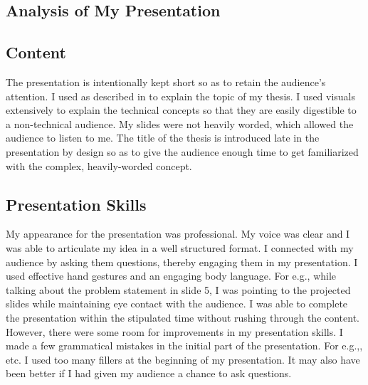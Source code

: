 \documentclass[letterpaper,12pt]{article}
\begin{document}
\begin{singlespacing}
\section*{Analysis of My Presentation}
\subsection*{Content}
The presentation is intentionally kept short so as to retain the audience's attention. I used  as described in \citep{markel_selber_2018} to explain the topic of my thesis. I used visuals extensively to explain the technical concepts so that they are easily digestible to a non-technical audience. My slides were not heavily worded, which allowed the audience to listen to me. The title of the thesis is introduced late in the presentation by design so as to give the audience enough time to get familiarized with the complex, heavily-worded concept.
\subsection*{Presentation Skills}
My appearance for the presentation was professional. My voice was clear and I was able to articulate my idea in a well structured format. I connected with my audience by asking them questions, thereby engaging them in my presentation. I used effective hand gestures and an engaging body language. For e.g., while talking about the problem statement in slide 5, I was pointing to the projected slides while maintaining eye contact with the audience. I was able to complete the presentation within the stipulated time without rushing through the content. \\
However, there were some room for improvements in my presentation skills. I made a few grammatical mistakes in the initial part of the presentation. For e.g.,, etc. I used too many fillers at the beginning of my presentation. It may also have been better if I had given my audience a chance to ask questions.





\end{singlespacing}
\end{document}
